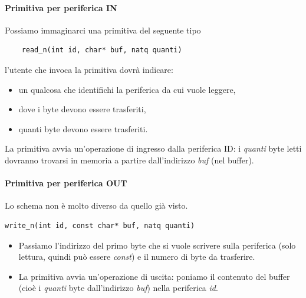 \documentclass[11pt]{report}
\theoremstyle{definition}
\begin{document}
\paragraph{Primitiva per periferica IN} Possiamo immaginarci una primitiva del seguente tipo
\begin{verbatim}
	read_n(int id, char* buf, natq quanti)
\end{verbatim}
l'utente che invoca la primitiva dovrà indicare: 
\begin{itemize}
	\item un qualcosa che identifichi la periferica da cui vuole leggere,
	\item dove i byte devono essere trasferiti,
	\item quanti byte devono essere trasferiti.
\end{itemize}  
La primitiva avvia un'operazione di ingresso dalla periferica ID: i \emph{quanti} byte letti dovranno trovarsi in memoria a partire dall'indirizzo \emph{buf} (nel buffer).

\paragraph{Primitiva per periferica OUT}
Lo schema non è molto diverso da quello già visto.
\begin{verbatim}
write_n(int id, const char* buf, natq quanti)
\end{verbatim} 
\begin{itemize}
	\item Passiamo l'indirizzo del primo byte che si vuole scrivere sulla periferica (solo lettura, quindi può essere \emph{const}) e il numero di byte da  trasferire.
	\item La primitiva avvia un'operazione di uscita: poniamo il contenuto del buffer (cioè i \emph{quanti} byte dall'indirizzo \emph{buf}) nella periferica \emph{id}. 
\end{itemize}
 
\end{document}
